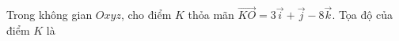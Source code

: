\begin{ex}
Trong không gian $Oxyz$, cho điểm $K$ thỏa mãn $\overrightarrow{KO}=3\vec i+\vec j-8\vec k$. Tọa độ của điểm $K$ là
\end{ex}
